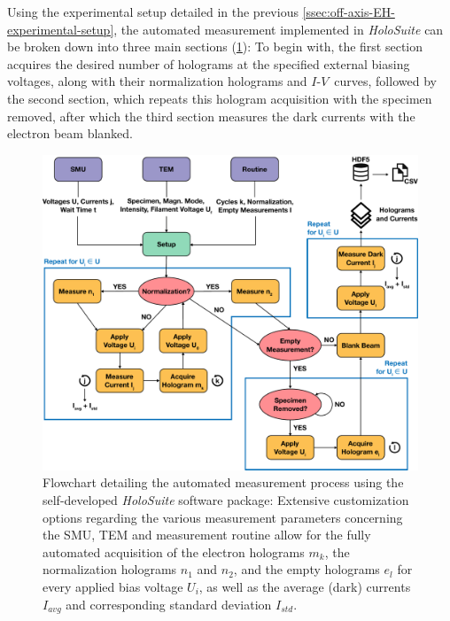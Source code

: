 Using the experimental setup detailed in the previous \cref{ssec:off-axis-EH-experimental-setup}, the automated measurement implemented in \emph{HoloSuite} can be broken down into three main sections (\cref{fig:flowchart-automatic-holography-measurement}): To begin with, the first section acquires the desired number of holograms at the specified external biasing voltages, along with their normalization holograms and $I$-$V$~curves, followed by the second section, which repeats this hologram acquisition with the specimen removed, after which the third section measures the dark currents with the electron beam blanked.
\begin{figure}[H]
	\centering
	\includegraphics[width=\textwidth]{Figures/Schematics/Automation/flowchart-automatic-holography-measurement.pdf}
	\caption{Flowchart detailing the automated measurement process using the self-developed \emph{HoloSuite} software package: Extensive customization options regarding the various measurement parameters concerning the SMU, TEM and measurement routine allow for the fully automated acquisition of the electron holograms $m_k$, the normalization holograms $n_1$ and $n_2$, and the empty holograms $e_l$ for every applied bias voltage $U_i$, as well as the average (dark) currents $I_{\mathit{avg}}$ and corresponding standard deviation $I_{\mathit{std}}$.}
	\label{fig:flowchart-automatic-holography-measurement}
\end{figure}
